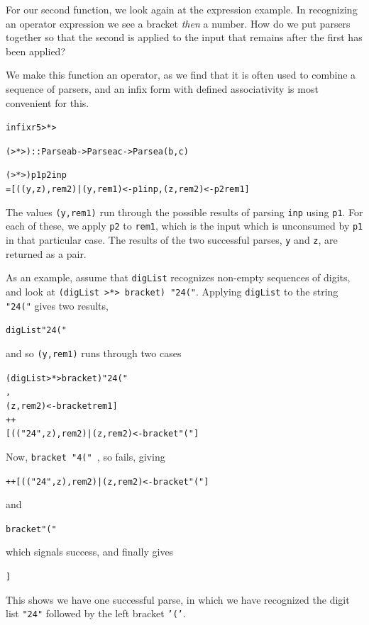 For our second function, we look again at the expression example. In
recognizing an operator expression we see a bracket {\em then\/} a number. How
do we put parsers together so that the second is applied to the input that
remains after the first has been applied?

We make this function an operator, as we find that it is often used to combine
a sequence of parsers, and an infix form with defined associativity is most
convenient for this.
\begin{alltt}
infixr 5 >*>

(>*>) :: Parse a b -> Parse a c -> Parse a (b,c)

(>*>) p1 p2 inp 
  = [((y,z),rem2) | (y,rem1) <- p1 inp , (z,rem2) <- p2 rem1 ]
\end{alltt}
The values \texttt{(y,rem1)} run through the 
possible results of parsing \texttt{inp} using 
\texttt{p1}. For each of these, we apply \texttt{p2} to 
\texttt{rem1}, which is the input which is unconsumed by \texttt{p1} in that
particular case. The results of the two successful parses, \texttt{y} and 
\texttt{z}, are returned as a pair.

As an example, assume that \texttt{digList} recognizes non-empty
sequences of digits, and
look at \texttt{(digList >*> bracket) "24("}.
Applying \texttt{digList} to the string \texttt{"24("} gives two results,
\begin{alltt}
digList "24(" \step [("2","4(") , ("24","(")]
\end{alltt}
and so \texttt{(y,rem1)} runs through two cases
\begin{alltt}
(digList >*> bracket) "24("
\step [((y,z),rem2) | (y,rem1) <- [("2","4(") , ("24","(")] ,
                    (z,rem2)  <- bracket rem1 ]
 ++
    [(("24",z),rem2) | (z,rem2)  <- bracket "(" ] 
\end{alltt}
Now, \texttt{bracket "4(" \step []}, so fails, giving
\begin{alltt}
\step [] ++ [(("24",z),rem2) | (z,rem2)  <- bracket "(" ] 
\end{alltt}
and
\begin{alltt}
bracket "(" \step [('(',"")]
\end{alltt}
which signals success, and finally gives\begin{alltt}   
\step [(("24",z),rem2) | (z,rem2)  <- [('(',"")] ] 
\step [ (("24",'(') , "") ]
\end{alltt}
This shows we have one successful parse, in which we have recognized the digit list
\texttt{"24"} followed by the left bracket \texttt{'('}.

